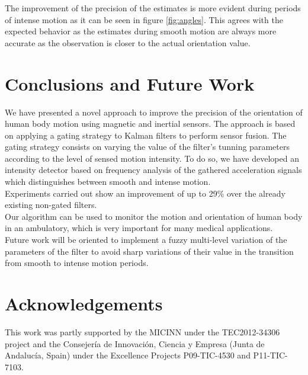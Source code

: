 \documentclass{IOS-Book-Article}
\begin{document}
The improvement of the precision of the estimates is more evident during periods of intense motion as it can be seen in figure \ref{fig:angles}. This agrees with the expected behavior as the estimates during smooth motion are always more accurate as the observation is closer to the actual orientation value. 

\section{Conclusions and Future Work}
\label{sec:conclusions}
\indent \indent We have presented a novel approach to improve the precision of the orientation of human body motion using magnetic and inertial sensors. The approach is based on applying a gating strategy to Kalman filters to perform sensor fusion. The gating strategy consists on varying the value of the filter's tunning parameters according to the level of sensed motion intensity. To do so, we have developed an intensity detector based on frequency analysis of the gathered acceleration signals which distinguishes between smooth and intense motion. \\
\indent Experiments carried out show an improvement of up to 29\% over the already existing non-gated filters. \\
\indent Our algorithm can be used to monitor the motion and orientation of human body in an ambulatory, which is very important for many medical applications.\\
\indent Future work will be oriented to implement a fuzzy multi-level variation of the parameters of the filter to avoid sharp variations of their value in the transition from smooth to intense motion periods.

\section*{Acknowledgements}
This work was partly supported by the MICINN under the TEC2012-34306 project and the Consejer\'ia de Innovaci\'on, Ciencia y Empresa (Junta de Andaluc\'ia, Spain) under the Excellence Projects P09-TIC-4530 and P11-TIC-7103.
\end{document}
